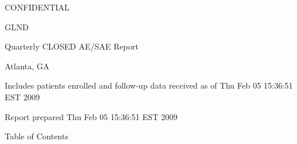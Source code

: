 \documentclass[dvips,10pt]{article}
\begin{document}
\vspace*{1in}
\begin{center}
{\Huge{CONFIDENTIAL}}
\end{center}
\vspace*{0.5in}
\begin{center}
{\Huge{GLND}}
\end{center}
\vspace*{0.25in}
\begin{center}
{\Huge{
Quarterly CLOSED AE/SAE Report
}}
\end{center}
\begin{center}
{\Huge{
 
}}
\end{center}
\begin{center}
{\Huge{Atlanta, GA}}
\end{center}
\vspace*{1in}
\begin{center}
\noindent
{\Large{Includes patients enrolled and follow-up data received as of Thu Feb 05 15:36:51 EST 2009}}
\end{center}
\vspace*{0.5in}
\begin{center}
{\Large{Report prepared  Thu Feb 05 15:36:51 EST 2009 }}
\end{center}
\clearpage
\vspace*{1in}
\begin{center}
{\Huge{Table of Contents}}
\end{center}
\listoftables
\listoffigures
\clearpage
\end{document}

